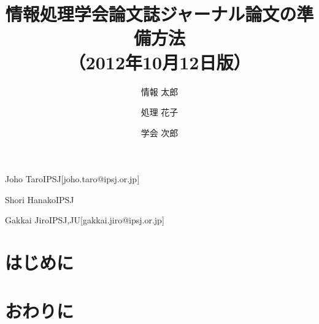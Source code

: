 \documentclass[submit,techrep]{ipsj}
\begin{document}
\title{情報処理学会論文誌ジャーナル論文の準備方法\\（2012年10月12日版）}
\author{情報 太郎}{Joho Taro}{IPSJ}[joho.taro@ipsj.or.jp]
\author{処理 花子}{Shori Hanako}{IPSJ}
\author{学会 次郎}{Gakkai Jiro}{IPSJ,JU}[gakkai.jiro@ipsj.or.jp]
\begin{abstract}
\end{abstract}
\maketitle
\section{はじめに}
\cite{latex}
\section{おわりに}
\begin{acknowledgment}
\end{acknowledgment}


\appendix
\end{document}

